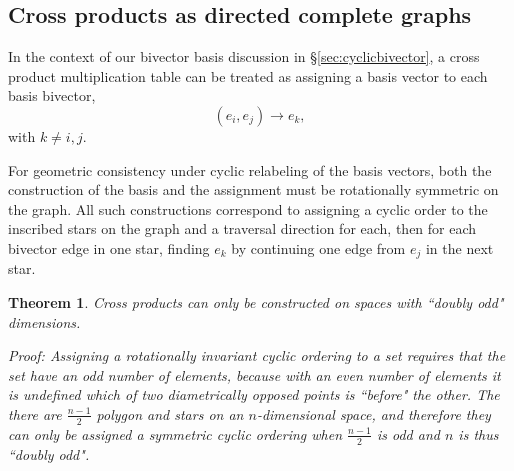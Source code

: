 \documentclass[11pt]{article}
\newcommand{\bv}[1][]{e_{#1}}
\newcommand{\bp}[2]{(#1,#2)}
\newtheorem{theorem}{Theorem}[section]
\begin{document}


\subsection{Cross products as directed complete graphs}

In the context of our bivector basis discussion in \S\ref{sec:cyclicbivector}, a cross product multiplication table can be treated as assigning a basis vector to each basis bivector,
\begin{equation}
\bp{\bv[i]}{\bv[j]} \rightarrow \bv[k],
\end{equation}
with  $k\neq i,j$. 

For geometric consistency under cyclic relabeling of the basis vectors, both the construction of the basis and the assignment must be rotationally symmetric on the graph. All such constructions correspond to assigning a cyclic order to the inscribed stars on the graph and a traversal direction for each, then for each bivector edge in one star, finding $\bv[k]$ by continuing one edge from $\bv[j]$ in the next star.


\begin{theorem}{Cross products can only be constructed on spaces with ``doubly odd" dimensions.}

Proof: Assigning a rotationally invariant cyclic ordering to a set requires that the set have an odd number of elements, because with an even number of elements it is undefined which of two diametrically opposed points is ``before" the other. The there are $\frac{n-1}{2}$ polygon and stars on an $n$-dimensional space, and therefore they can only be assigned a symmetric cyclic ordering when $\frac{n-1}{2}$  is odd and $n$ is thus ``doubly odd".

\end{theorem}
\end{document}
